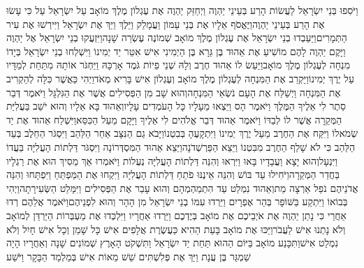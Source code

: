 \documentclass[../main/main.tex]{subfiles}
\begin{document}
\begin{multicols*}{\ncols}
וַיֹּסִפוּ בְּנֵי יִשְׂרָאֵל לַעֲשׂוֹת הָרַע בְּעֵינֵי יַהְוֶה וַיְחַזֵּק יַהְוֶה אֶת עֶגְלוֹן מֶלֶךְ מוֹאָב עַל יִשְׂרָאֵל עַל כִּי עָשׂוּ אֶת הָרַע בְּעֵינֵי יַהְוֶה\PreVerseSpace{}וַיֶּאֱסֹף אֵלָיו אֶת בְּנֵי עַמּוֹן וַעֲמָלֵק וַיֵּלֶךְ וַיַּךְ אֶת יִשְׂרָאֵל וַיִּירְשׁוּ אֶת עִיר הַתְּמָרִים\PreVerseSpace{}וַיַּעַבְדוּ בְנֵי יִשְׂרָאֵל אֶת עֶגְלוֹן מֶלֶךְ מוֹאָב שְׁמוֹנֶה עֶשְׂרֵה שָׁנָה\PreVerseSpace{}וַיִּזְעֲקוּ בְנֵי יִשְׂרָאֵל אֶל יַהְוֶה וַיָּקֶם יַהְוֶה לָהֶם מוֹשִׁיעַ אֶת אֵהוּד בֶּן גֵּרָא בֶּן הַיְמִינִי אִישׁ אִטֵּר יַד יְמִינוֹ וַיִּשְׁלְחוּ בְנֵי יִשְׂרָאֵל בְּיָדוֹ מִנְחָה לְעֶגְלוֹן מֶלֶךְ מוֹאָב\PreVerseSpace{}וַיַּעַשׂ לוֹ אֵהוּד חֶרֶב וְלָהּ שְׁנֵי פֵיוֹת גֹּמֶד אָרְכָּהּ וַיַּחְגֹּר אוֹתָהּ מִתַּחַת לְמַדָּיו עַל יֶרֶךְ יְמִינוֹ\PreVerseSpace{}וַיַּקְרֵב אֶת הַמִּנְחָה לְעֶגְלוֹן מֶלֶךְ מוֹאָב וְעֶגְלוֹן אִישׁ בָּרִיא מְאֹד\PreVerseSpace{}וַיְהִי כַּאֲשֶׁר כִּלָּה לְהַקְרִיב אֶת הַמִּנְחָה וַיְשַׁלַּח אֶת הָעָם נֹשְׂאֵי הַמִּנְחָה\PreVerseSpace{}וְהוּא שָׁב מִן הַפְּסִילִים אֲשֶׁר אֶת הַגִּלְגָּל וַיֹּאמֶר דְּבַר סֵתֶר לִי אֵלֶיךָ הַמֶּלֶךְ וַיֹּאמֶר הָס וַיֵּצְאוּ מֵעָלָיו כָּל הָעֹמְדִים עָלָיו\PreVerseSpace{}וְאֵהוּד בָּא אֵלָיו וְהוּא יֹשֵׁב בַּעֲלִיַּת הַמְּקֵרָה אֲשֶׁר לוֹ לְבַדּוֹ וַיֹּאמֶר אֵהוּד דְּבַר אֱלֹהִים לִי אֵלֶיךָ וַיָּקָם מֵעַל הַכִּסֵּא\PreVerseSpace{}וַיִּשְׁלַח אֵהוּד אֶת יַד שְׂמֹאלוֹ וַיִּקַּח אֶת הַחֶרֶב מֵעַל יֶרֶךְ יְמִינוֹ וַיִּתְקָעֶהָ בְּבִטְנוֹ\PreVerseSpace{}וַיָּבֹא גַם הַנִּצָּב אַחַר הַלַּהַב וַיִּסְגֹּר הַחֵלֶב בְּעַד הַלַּהַב כִּי לֹא שָׁלַף הַחֶרֶב מִבִּטְנוֹ וַיֵּצֵא הַפַּרְשְׁדֹנָה\PreVerseSpace{}וַיֵּצֵא אֵהוּד הַמִּסְדְּרוֹנָה וַיִּסְגֹּר דַּלְתוֹת הָעֲלִיָּה בַּעֲדוֹ וַיִּנְעָל\SubEnd{}\PreVerseSpace{}וְהוּא יָצָא וַעֲבָדָיו בָּאוּ וַיִּרְאוּ וְהִנֵּה דַּלְתוֹת הָעֲלִיָּה נְעֻלוֹת וַיֹּאמְרוּ אַךְ מֵסִיךְ הוּא אֶת רַגְלָיו בַּחֲדַר הַמְּקֵרָה\PreVerseSpace{}וַיֹּחִילוּ\SubEnd{} עַד בּוֹשׁ וְהִנֵּה אֵינֶנּוּ פֹתֵחַ דַּלְתוֹת הָעֲלִיָּה וַיִּקְחוּ אֶת הַמַּפְתֵּחַ וַיִּפְתָּחוּ וְהִנֵּה אֲדֹנֵיהֶם נֹפֵל אַרְצָה מֵת\PreVerseSpace{}וְאֵהוּד נִמְלַט עַד הִתְמַהְמְהָם וְהוּא עָבַר אֶת הַפְּסִילִים וַיִּמָּלֵט הַשְּׂעִירָתָה\PreVerseSpace{}וַיְהִי בְּבוֹאוֹ וַיִּתְקַע בַּשּׁוֹפָר בְּהַר אֶפְרָיִם וַיֵּרְדוּ עִמּוֹ בְנֵי יִשְׂרָאֵל מִן הָהָר וְהוּא לִפְנֵיהֶם\PreVerseSpace{}וַיֹּאמֶר אֲלֵהֶם רְדוּ\SubEnd{} אַחֲרַי כִּי נָתַן יַהְוֶה אֶת אֹיְבֵיכֶם אֶת מוֹאָב בְּיֶדְכֶם וַיֵּרְדוּ אַחֲרָיו וַיִּלְכְּדוּ אֶת מַעְבְּרוֹת הַיַּרְדֵּן לְמוֹאָב וְלֹא נָתְנוּ אִישׁ לַעֲבֹר\PreVerseSpace{}וַיַּכּוּ אֶת מוֹאָב בָּעֵת הַהִיא כַּעֲשֶׂרֶת אֲלָפִים אִישׁ כָּל שָׁמֵן וְכָל אִישׁ חָיִל וְלֹא נִמְלַט אִישׁ\PreVerseSpace{}וַתִּכָּנַע מוֹאָב בַּיּוֹם הַהוּא תַּחַת יַד יִשְׂרָאֵל וַתִּשְׁקֹט הָאָרֶץ שְׁמוֹנִים שָׁנָה \ClosedSection{}וְאַחֲרָיו הָיָה שַׁמְגַּר בֶּן עֲנָת וַיַּךְ אֶת פְּלִשְׁתִּים שֵׁשׁ מֵאוֹת אִישׁ בְּמַלְמַד הַבָּקָר וַיֹּשַׁע 
\end{multicols*}
\end{document}
